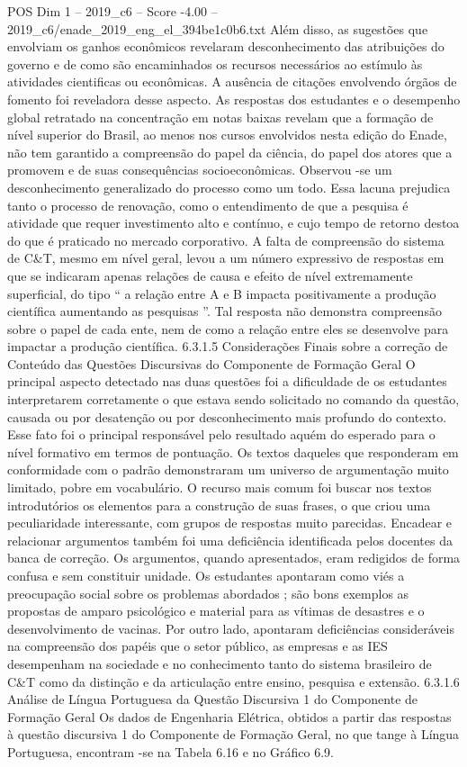 \begin{textsample}{POS Dim 1 – 2019\_c6 – Score -4.00 – 2019\_c6/enade\_2019\_eng\_el\_394be1c0b6.txt}
Além disso, as sugestões que envolviam os ganhos econômicos revelaram desconhecimento das atribuições do governo e de como são encaminhados os recursos necessários ao estímulo às atividades cientificas ou econômicas.
A ausência de citações envolvendo órgãos de fomento foi reveladora desse aspecto.
As respostas dos estudantes e o desempenho global retratado na concentração em notas baixas revelam que a formação de nível superior do Brasil, ao menos nos cursos envolvidos nesta edição do Enade, não tem garantido a compreensão do papel da ciência, do papel dos atores que a promovem e de suas consequências socioeconômicas.
Observou -se um desconhecimento generalizado do processo como um todo.
Essa lacuna prejudica tanto o processo de renovação, como o entendimento de que a pesquisa é atividade que requer investimento alto e contínuo, e cujo tempo de retorno destoa do que é praticado no mercado corporativo.
A falta de compreensão do sistema de C\&T, mesmo em nível geral, levou a um número expressivo de respostas em que se indicaram apenas relações de causa e efeito de nível extremamente superficial, do tipo “ a relação entre A e B impacta positivamente a produção científica aumentando as pesquisas ”.
Tal resposta não demonstra compreensão sobre o papel de cada ente, nem de como a relação entre eles se desenvolve para impactar a produção científica. 6.3.1.5 Considerações Finais sobre a correção de Conteúdo das Questões Discursivas do Componente de Formação Geral O principal aspecto detectado nas duas questões foi a dificuldade de os estudantes interpretarem corretamente o que estava sendo solicitado no comando da questão, causada ou por desatenção ou por desconhecimento mais profundo do contexto.
Esse fato foi o principal responsável pelo resultado aquém do esperado para o nível formativo em termos de pontuação.
Os textos daqueles que responderam em conformidade com o padrão demonstraram um universo de argumentação muito limitado, pobre em vocabulário.
O recurso mais comum foi buscar nos textos introdutórios os elementos para a construção de suas frases, o que criou uma peculiaridade interessante, com grupos de respostas muito parecidas.
Encadear e relacionar argumentos também foi uma deficiência identificada pelos docentes da banca de correção.
Os argumentos, quando apresentados, eram redigidos de forma confusa e sem constituir unidade.
Os estudantes apontaram como viés a preocupação social sobre os problemas abordados ; são bons exemplos as propostas de amparo psicológico e material para as vítimas de desastres e o desenvolvimento de vacinas.
Por outro lado, apontaram deficiências consideráveis na compreensão dos papéis que o setor público, as empresas e as IES desempenham na sociedade e no conhecimento tanto do sistema brasileiro de C\&T como da distinção e da articulação entre ensino, pesquisa e extensão. 6.3.1.6 Análise de Língua Portuguesa da Questão Discursiva 1 do Componente de Formação Geral Os dados de Engenharia Elétrica, obtidos a partir das respostas à questão discursiva 1 do Componente de Formação Geral, no que tange à Língua Portuguesa, encontram -se na Tabela 6.16 e no Gráfico 6.9.

\end{textsample}
